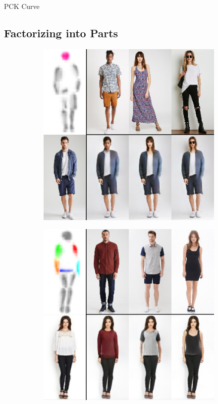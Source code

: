 	PCK Curve
	\subsection{Factorizing into Parts}
	\begin{figure}[t]
		\begin{subfigure}{0.49\linewidth}
		\centering
		\includegraphics[trim={0cm 0cm 0cm 0cm},clip, width=1.\linewidth]{fig/part_head}\caption{}
		\label{fig:part3_00}
		\end{subfigure}
		\begin{subfigure}{0.49\linewidth}
		\centering
		\includegraphics[trim={0cm 0cm 0cm 0cm},clip, width=1.\linewidth]{fig/part_body}\caption{}

\end{subfigure}
\end{figure}
